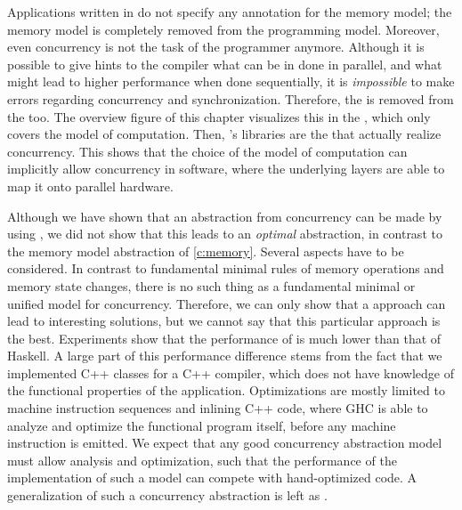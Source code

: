 Applications written in \ourfp do not specify any annotation for the memory model; the memory model is completely removed from the programming model.
Moreover, even concurrency is not the task of the programmer anymore.
Although it is possible to give hints to the compiler what can be in done in parallel, and what might lead to higher performance when done sequentially, it is \emph{impossible} to make errors regarding concurrency and synchronization.
Therefore, the  is removed from the  too.
The overview figure of this chapter \chapfigpageref visualizes this in the , which only covers the model of computation.
Then, \ourfp's libraries are the  that actually realize concurrency.
This shows that the choice of the model of computation can implicitly allow concurrency in software, where the underlying layers are able to map it onto parallel hardware.

Although we have shown that an abstraction from concurrency can be made by using \lcalc, we did not show that this leads to an \emph{optimal} abstraction, in contrast to the memory model abstraction of \cref{c:memory}.
Several aspects have to be considered.
In contrast to fundamental minimal rules of memory operations and memory state changes, there is no such thing as a fundamental minimal or unified model for concurrency.
Therefore, we can only show that a \codesign approach can lead to interesting solutions, but we cannot say that this particular approach is the best.
Experiments show that the performance of \ourfp is much lower than that of Haskell.
A large part of this performance difference stems from the fact that we implemented C++ classes for a C++ compiler, which does not have knowledge of the functional properties of the application.
Optimizations are mostly limited to machine instruction sequences and inlining C++ code, where \ac{GHC} is able to analyze and optimize the functional program itself, before any machine instruction is emitted.
We expect that any good concurrency abstraction model must allow analysis and optimization, such that the performance of the implementation of such a model can compete with hand-optimized code.
A generalization of such a concurrency abstraction is left as .

